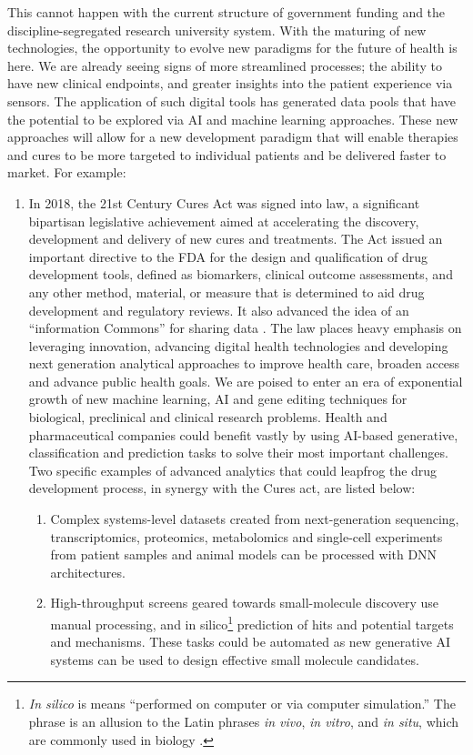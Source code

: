 This cannot happen with the current structure of government funding and the discipline-segregated research university system. With the maturing of new technologies, the opportunity to evolve new paradigms for the future of health is here. We are already seeing signs of more streamlined processes; the ability to have new clinical endpoints, and greater insights into the patient experience via sensors. The application of such digital tools has generated data pools that have the potential to be explored via \ac{AI} and machine learning approaches. These new approaches will allow for a new development paradigm that will enable therapies and cures to be more targeted to individual patients and be delivered faster to market. For example:

\begin{enumerate}
\item In 2018, the 21st Century Cures Act was signed into law, a significant bipartisan legislative achievement aimed at accelerating the discovery, development and delivery of new cures and treatments. The Act issued an important directive to the FDA for the design and qualification of drug development tools, defined as biomarkers,  clinical outcome assessments, and any other method, material, or measure that is determined to aid drug development and regulatory reviews. It also advanced the idea of an ``information Commons'' for sharing data \cite{21centdatashare}. The law places heavy emphasis on leveraging innovation, advancing digital health technologies and developing next generation analytical approaches to improve health care, broaden access and advance public health goals. We are poised to enter an era of exponential growth of new machine learning, \ac{AI} and gene editing techniques for biological, preclinical and clinical research problems. Health and pharmaceutical companies could benefit vastly by using \ac{AI}-based generative, classification and prediction tasks to solve their most important challenges. Two specific examples of advanced analytics that could leapfrog the drug development process, in synergy with the Cures act, are listed below:

\begin{enumerate}
\item Complex systems-level datasets created from next-generation sequencing, transcriptomics, proteomics, metabolomics and single-cell experiments from patient samples and animal models can be processed with \ac{DNN} architectures.
\item High-throughput screens geared towards small-molecule discovery use manual processing, and in silico\footnote{\textit{In silico} is means ``performed on computer or via computer simulation.'' The phrase is an allusion to the Latin phrases \textit{in vivo}, \textit{in vitro}, and \textit{in situ}, which are commonly used in biology \cite{wikipedia:insilico}.} prediction of hits and potential targets and mechanisms. These tasks could be automated as new generative \ac{AI} systems can be used to design effective small molecule candidates.
\end{enumerate}
\end{enumerate}


